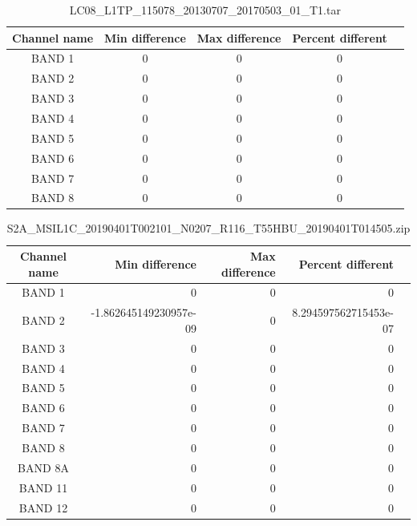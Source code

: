 \documentclass[a4paper]{article}
\begin{document}
    \begin{table}[ht!]
      \caption{LC08\_L1TP\_115078\_20130707\_20170503\_01\_T1.tar}\label{table:16}
      \centering
      \small
      \begin{tabular}{ccccc} \midrule
        \textbf{Channel name} & \textbf{Min difference} & \textbf{Max difference} & \textbf{Percent different} \\ \midrule
        BAND 1 & 0 & 0 & 0 \\
        BAND 2 & 0 & 0 & 0 \\
        BAND 3 & 0 & 0 & 0 \\
        BAND 4 & 0 & 0 & 0 \\
        BAND 5 & 0 & 0 & 0 \\
        BAND 6 & 0 & 0 & 0 \\
        BAND 7 & 0 & 0 & 0 \\
        BAND 8 & 0 & 0 & 0 \\ \midrule
      \end{tabular}
    \end{table}

  \clearpage

    \begin{table}[ht!]
      \caption{\footnotesize{S2A\_MSIL1C\_20190401T002101\_N0207\_R116\_T55HBU\_20190401T014505.zip}}\label{table:17}
      \centering
      \small
      \begin{tabular}{|c|n{2}{4}|n{2}{4}|n{2}{4}|n{2}{4}|} \hline
        \textbf{Channel name} & \textbf{Min difference} & \textbf{Max difference} & \textbf{Percent different} \\ \midrule
        BAND 1 & 0 & 0 & 0 \\
        BAND 2 & -1.862645149230957e-09 & 0 & 8.294597562715453e-07 \\
        BAND 3 & 0 & 0 & 0 \\
        BAND 4 & 0 & 0 & 0 \\
        BAND 5 & 0 & 0 & 0 \\
        BAND 6 & 0 & 0 & 0 \\
        BAND 7 & 0 & 0 & 0 \\
        BAND 8 & 0 & 0 & 0 \\
        BAND 8A & 0 & 0 & 0 \\
        BAND 11 & 0 & 0 & 0 \\
        BAND 12 & 0 & 0 & 0 \\ \midrule
      \end{tabular}
    \end{table}
\end{document}
